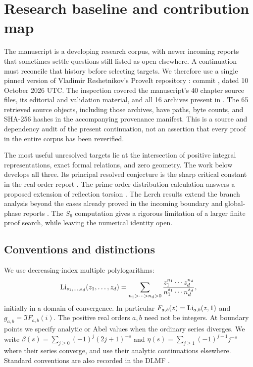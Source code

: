 \section{Research baseline and contribution map}
\label{sec:introduction}

The manuscript is a developing research corpus, with newer incoming
reports that sometimes settle questions still listed as open elsewhere.
A continuation must reconcile that history before selecting targets.
We therefore use a single pinned version of Vladimir Reshetnikov's
ProveIt repository \cite{repo}: commit \snapshot, dated 10 October 2026
UTC. The inspection covered the manuscript's 40 chapter source files,
its editorial and validation material, and all 16 archives present in
. The 65 retrieved source objects, including those
archives, have paths, byte counts, and SHA-256 hashes in the accompanying
provenance manifest. This is a source and dependency audit of the present
continuation, not an assertion that every proof in the entire corpus
has been reverified.

The most useful unresolved targets lie at the intersection of positive
integral representations, exact formal relations, and zero geometry.
The work below develops all three. Its principal resolved conjecture is
the sharp critical constant in the real-order report \cite{realorder}.
The prime-order distribution calculation answers a proposed extension
of reflection torsion \cite{integraljets}. The Lerch results extend the
branch analysis beyond the cases already proved in the incoming
boundary and global-phase reports \cite{lershape:Boundary,lershape:Globalphase}.
The $S_6$ computation gives a rigorous limitation of a larger finite
proof search, while leaving the numerical identity open.

\subsection{Conventions and distinctions}

We use decreasing-index multiple polylogarithms:
\[
 \operatorname{Li}_{s_1,\ldots,s_d}(z_1,\ldots,z_d)
 =\sum_{n_1>\cdots>n_d>0}
   \frac{z_1^{n_1}\cdots z_d^{n_d}}
        {n_1^{s_1}\cdots n_d^{s_d}},
\]
initially in a domain of convergence. In particular
$F_{a,b}(z)=\operatorname{Li}_{a,b}(z,1)$ and $g_{a,b}=\Im F_{a,b}(i)$.
The positive real orders $a,b$ need not be integers. At boundary points
we specify analytic or Abel values when the ordinary series diverges.
We write $\beta(s)=\sum_{j\ge0}(-1)^j(2j+1)^{-s}$ and
$\eta(s)=\sum_{j\ge1}(-1)^{j-1}j^{-s}$ where their series converge,
and use their analytic continuations elsewhere. Standard conventions
are also recorded in the DLMF \cite{dlmf-polylog,dlmf-hurwitz}.

